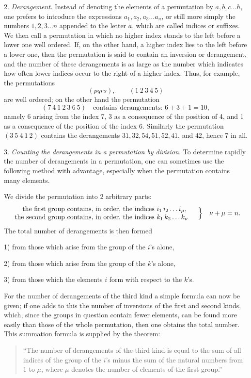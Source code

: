 \documentclass[10pt]{article}
\begin{document}
2. \emph{Derangement.} Instead of denoting the elements of a permutation by \(a,b,c\ldots h\), one prefers to introduce the expressions \(a_1,a_2,a_3\ldots a_n\), or still more simply the numbers \(1,2,3\ldots n\) appended to the letter \(a\), which are called indices or suffixes. We then call a permutation in which no higher index stands to the left before a lower one well ordered. If, on the other hand, a higher index lies to the left before a lower one, then the permutation is said to contain an inversion or derangement, and the number of these derangements is as large as the number which indicates how often lower indices occur to the right of a higher index. Thus, for example, the permutations
\[
(pqrs),\qquad (1\ 2\ 3\ 4\ 5)
\]
are well ordered; on the other hand the permutation
\[
(7\ 4\ 1\ 2\ 3\ 6\ 5)\quad\text{contains derangements: }6+3+1=10,
\]
namely 6 arising from the index 7, 3 as a consequence of the position of 4, and 1 as a consequence of the position of the index 6. Similarly the permutation \((3\ 5\ 4\ 1\ 2)\) contains the derangements \(31,32,54,51,52,41\), and \(42\), hence 7 in all.

3. \emph{Counting the derangements in a permutation by division.} To determine rapidly the number of derangements in a permutation, one can sometimes use the following method with advantage, especially when the permutation contains many elements.

We divide the permutation into 2 arbitrary parts:
\[
\begin{array}{r@{\ }l}
\text{the first group contains, in order, the indices} & i_1\,i_2\ldots i_\mu,\\
\text{the second group contains, in order, the indices} & k_1\,k_2\ldots k_\nu
\end{array}
\quad\Big\}\quad \nu+\mu=n.
\]
The total number of derangements is then formed

1) from those which arise from the group of the \(i\)'s alone,

2) from those which arise from the group of the \(k\)'s alone,

3) from those which the elements \(i\) form with respect to the \(k\)'s.

For the number of derangements of the third kind a simple formula can now be given; if one adds to this the number of inversions of the first and second kinds, which, since the groups in question contain fewer elements, can be found more easily than those of the whole permutation, then one obtains the total number. This summation formula is supplied by the theorem:
\begin{quote}
``The number of derangements of the third kind is equal to the sum of all indices of the group of the \(i\)'s minus the sum of the natural numbers from 1 to \(\mu\), where \(\mu\) denotes the number of elements of the first group.''
\end{quote}
\end{document}
